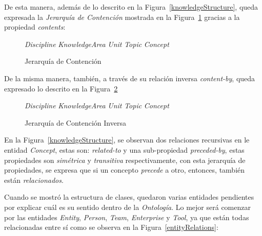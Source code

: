 \begin{itemize}
De esta manera, además de lo descrito en la Figura~\ref{knowledgeStructure}, queda expresada la \textit{Jerarquía de Contención} mostrada en la Figura~\ref{contentHierarchy} gracias a la propiedad \textit{contents}:

\begin{figure}[!h]
    \begin{center}
        \textit{Discipline} \subseteq \textit{KnowledgeArea} \subseteq \textit{Unit} \subseteq \textit{Topic} \subseteq \textit{Concept}
        \caption{Jerarquía de Contención}
        \label{contentHierarchy}
    \end{center}
\end{figure}

De la misma manera, también, a través de su relación inversa \textit{content-by}, queda expresado lo descrito en la Figura~\ref{inverseContentHierarchy}

\begin{figure}[!h]
    \begin{center}
        \textit{Discipline} \supseteq \textit{KnowledgeArea} \supseteq \textit{Unit} \supseteq \textit{Topic} \supseteq \textit{Concept}
        \caption{Jerarquía de Contención Inversa}
        \label{inverseContentHierarchy}
    \end{center}
\end{figure}

En la Figura~\ref{knowledgeStructure}, se observan dos relaciones recursivas en le entidad \textit{Concept}, estas son: \textit{related-to} y una sub-propiedad \textit{preceded-by}, estas propiedades son \textit{simétrica} y \textit{transitiva} respectivamente, con esta jerarquía de propiedades, se expresa que si un concepto \textit{precede} a otro, entonces, también están \textit{relacionados}.

Cuando se mostró la estructura de clases, quedaron varias entidades pendientes por explicar cuál es su sentido dentro de la \textit{Ontología}. Lo mejor será comenzar por las entidades \textit{Entity}, \textit{Person}, \textit{Team}, \textit{Enterprise} y \textit{Tool}, ya que están todas relacionadas entre sí como se observa en la Figura~\ref{entityRelations}:


\end{itemize}
